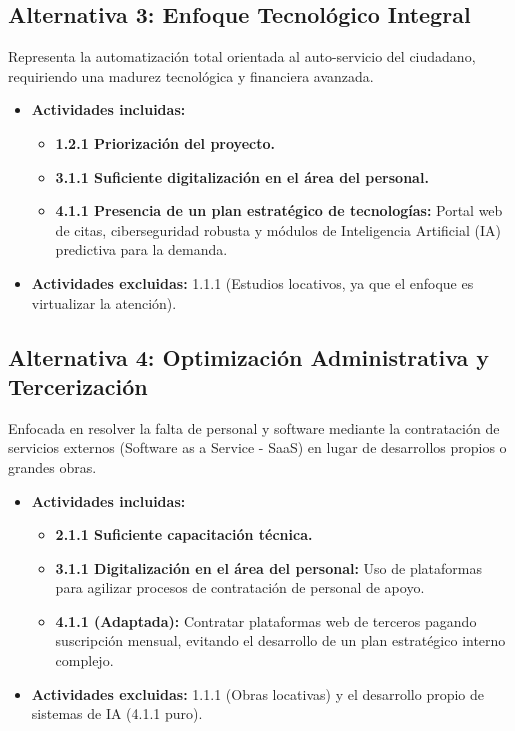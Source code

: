 \subsection*{Alternativa 3: Enfoque Tecnológico Integral}
Representa la automatización total orientada al auto-servicio del ciudadano, requiriendo una madurez tecnológica y financiera avanzada.
\begin{itemize}
    \item \textbf{Actividades incluidas:}
    \begin{itemize}
        \item \textbf{1.2.1 Priorización del proyecto.}
        \item \textbf{3.1.1 Suficiente digitalización en el área del personal.}
        \item \textbf{4.1.1 Presencia de un plan estratégico de tecnologías:} Portal web de citas, ciberseguridad robusta y módulos de Inteligencia Artificial (IA) predictiva para la demanda.
    \end{itemize}
    \item \textbf{Actividades excluidas:} 1.1.1 (Estudios locativos, ya que el enfoque es virtualizar la atención).
\end{itemize}

\subsection*{Alternativa 4: Optimización Administrativa y Tercerización}
Enfocada en resolver la falta de personal y software mediante la contratación de servicios externos (Software as a Service - SaaS) en lugar de desarrollos propios o grandes obras.
\begin{itemize}
    \item \textbf{Actividades incluidas:}
    \begin{itemize}
        \item \textbf{2.1.1 Suficiente capacitación técnica.}
        \item \textbf{3.1.1 Digitalización en el área del personal:} Uso de plataformas para agilizar procesos de contratación de personal de apoyo.
        \item \textbf{4.1.1 (Adaptada):} Contratar plataformas web de terceros pagando suscripción mensual, evitando el desarrollo de un plan estratégico interno complejo.
    \end{itemize}
    \item \textbf{Actividades excluidas:} 1.1.1 (Obras locativas) y el desarrollo propio de sistemas de IA (4.1.1 puro).
\end{itemize}

